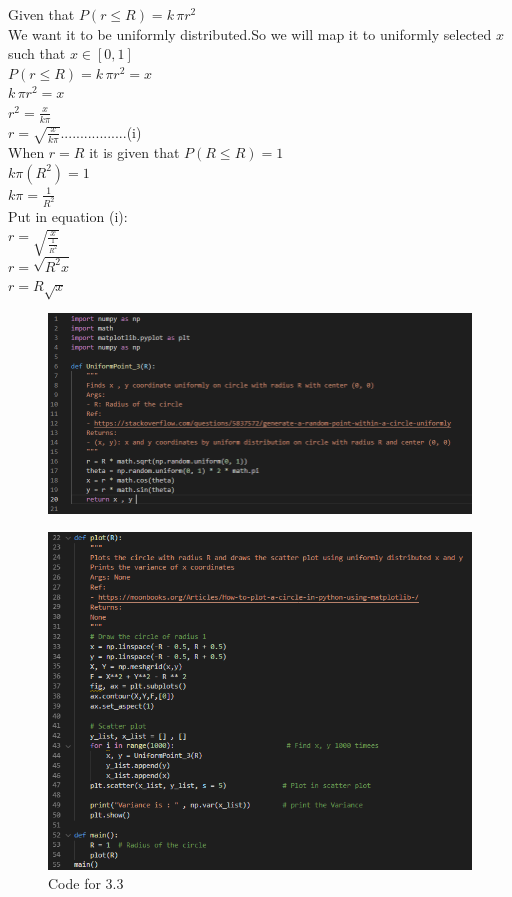 \documentclass[answers]{exam}
\begin{document}
\begin{framed}
    Given that $P(r \leq R) = k \, \pi r^2 $\\
    We want it to be uniformly distributed.So we will map it to uniformly selected $x$ such that $x \in [0, 1]$ \\
    $P(r \leq R) = k \, \pi r^2 = x$\\
    $k \, \pi r^2 = x$\\
    $r^2 = \frac{x}{k \pi}$\\
    $r = \sqrt{\frac{x}{k\pi}}$.................(i)\\
    When $r = R$ it is given that $P(R \leq R) = 1$\\
    $k\pi(R^2) = 1$\\
    $k\pi = \frac{1}{R^2}$\\
    Put in equation (i): \\ 
    $r = \sqrt{\frac{x}{\frac{1}{R^2}}}$\\
    $r = \sqrt{R^2 x}$\\
    $r = R \sqrt{x}$ \\
    
    \begin{figure}[H]
        \centering
        \includegraphics[width=1\textwidth]{Q3.3_code_1.PNG}
    \end{figure}
    
    \begin{figure}[H]
        \centering
        \includegraphics[width=1\textwidth]{Q3.3_code_2.PNG}
        \caption{Code for 3.3}
    \end{figure}
    

\end{framed}
\end{document}
